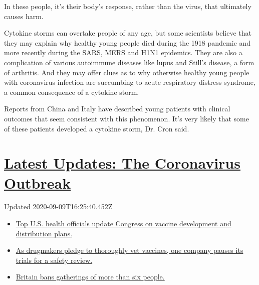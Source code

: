 In these people, it's their body's response, rather than the virus, that
ultimately causes harm.

Cytokine storms can overtake people of any age, but some scientists
believe that they may explain why healthy young people died during the
1918 pandemic and more recently during the SARS, MERS and H1N1
epidemics. They are also a complication of various autoimmune diseases
like lupus and Still's disease, a form of arthritis. And they may offer
clues as to why otherwise healthy young people with coronavirus
infection are succumbing to acute respiratory distress syndrome, a
common consequence of a cytokine storm.

Reports from China and Italy have described young patients with clinical
outcomes that seem consistent with this phenomenon. It's very likely
that some of these patients developed a cytokine storm, Dr. Cron said.

\hypertarget{latest-updates-the-coronavirus-outbreak}{%
\section{\texorpdfstring{\href{https://www.nytimes3xbfgragh.onion/2020/09/09/world/covid-19-coronavirus.html?action=click\&pgtype=Article\&state=default\&region=MAIN_CONTENT_1\&context=storylines_live_updates}{Latest
Updates: The Coronavirus
Outbreak}}{Latest Updates: The Coronavirus Outbreak}}\label{latest-updates-the-coronavirus-outbreak}}

Updated 2020-09-09T16:25:40.452Z

\begin{itemize}
\tightlist
\item
  \href{https://www.nytimes3xbfgragh.onion/2020/09/09/world/covid-19-coronavirus.html?action=click\&pgtype=Article\&state=default\&region=MAIN_CONTENT_1\&context=storylines_live_updates\#link-279e24e2}{Top
  U.S. health officials update Congress on vaccine development and
  distribution plans.}
\item
  \href{https://www.nytimes3xbfgragh.onion/2020/09/09/world/covid-19-coronavirus.html?action=click\&pgtype=Article\&state=default\&region=MAIN_CONTENT_1\&context=storylines_live_updates\#link-5b0bf0d1}{As
  drugmakers pledge to thoroughly vet vaccines, one company pauses its
  trials for a safety review.}
\item
  \href{https://www.nytimes3xbfgragh.onion/2020/09/09/world/covid-19-coronavirus.html?action=click\&pgtype=Article\&state=default\&region=MAIN_CONTENT_1\&context=storylines_live_updates\#link-58edc4cb}{Britain
  bans gatherings of more than six people.}
\end{itemize}


